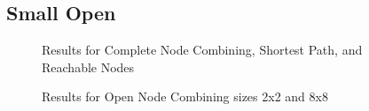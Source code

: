 \documentclass[runningheads]{llncs}
\begin{document}
\subsection{Small Open}
\begin{figure}[H]
\begin{minipage}{.4\linewidth} 
\caption{Results for Complete Node Combining, Shortest Path, and Reachable Nodes}
\end{minipage}
\hspace{1.5cm}
\begin{minipage}{.4\linewidth} 
\caption{Results for Open Node Combining sizes 2x2 and 8x8}
\end{minipage}
\end{figure} 
\end{document}
